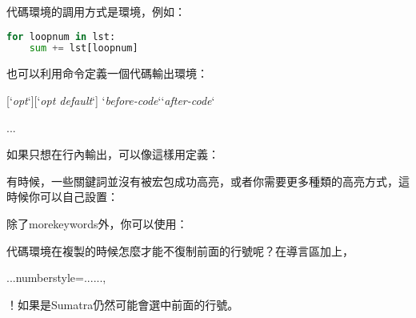 代碼環境的調用方式是環境，例如：
\begin{latex}
\begin{lstlisting}[language=Python]
for loopnum in lst:
    sum += lst[loopnum]
\end{lstlisting}
\end{latex}

也可以利用命令定義一個代碼輸出環境：
\begin{latex}
    [`\textit{opt}`][`\textit{opt default}`]
    {`\textit{before-code}`}{`\textit{after-code}`}
\begin{envi-name}...\end{envi-name}
\end{latex}

如果只想在行內輸出，可以像這樣用定義：
\begin{latex}
\newcommand{\inlatexline}[1]{{\lstinline
    [language=TeX,basicstyle=\small\ttfamily]{#1}}}
\end{latex}

有時候，一些關鍵詞並沒有被宏包成功高亮，或者你需要更多種類的高亮方式，這時候你可以自己設置：
\begin{latex}
\end{latex}

除了morekeywords外，你可以使用：
\begin{latex}
\lstdefinestyle{...}{
    morecomment=[l]{//}, %
    morecomment=[s]{/*}{*/}, %
    morecomment=[n]{(*}{*)}, %
    morestring=[b]", %
\end{latex}

代碼環境在複製的時候怎麼才能不復制前面的行號呢？在導言區加上，
\begin{latex}
\usepackage{accsupp}
\newcommand{\emptyaccsupp}[1]
    {#1\EndAccSupp{}}
...numberstyle=...\emptyaccsupp...,
\end{latex}

！如果是Sumatra仍然可能會選中前面的行號。


